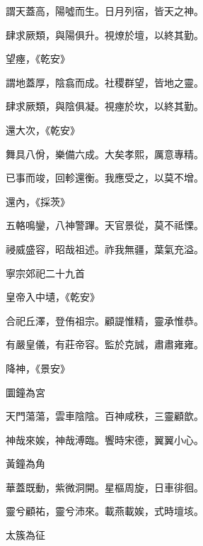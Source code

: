 \begin{pinyinscope}
 謂天蓋高，陽噓而生。日月列宿，皆天之神。



 肆求厥類，與陽俱升。視燎於壇，以終其勤。



 望瘞，《乾安》



 謂地蓋厚，陰翕而成。社稷群望，皆地之靈。



 肆求厥類，與陰俱凝。視瘞於坎，以終其勤。



 還大次，《乾安》



 舞具八佾，樂備六成。大矣孝熙，厲意專精。



 已事而竣，回軫還衡。我應受之，以莫不增。



 還內，《採茨》



 五輅鳴鑾，八神警蹕。天官景從，莫不祗慄。



 祲威盛容，昭哉祖述。祚我無疆，葉氣充溢。



 寧宗郊祀二十九首



 皇帝入中壝，《乾安》



 合祀丘澤，登侑祖宗。顧諟惟精，靈承惟恭。



 有嚴皇儀，有莊帝容。監於克誠，肅肅雍雍。



 降神，《景安》



 圜鐘為宮



 天門蕩蕩，雲車陰陰。百神咸秩，三靈顧歆。



 神哉來娭，神哉溥臨。饗時宋德，翼翼小心。



 黃鐘為角



 華蓋既動，紫微洞開。星樞周旋，日車徘徊。



 靈兮顧祐，靈兮沛來。載燕載娭，式時壇垓。



 太簇為征




\end{pinyinscope}
